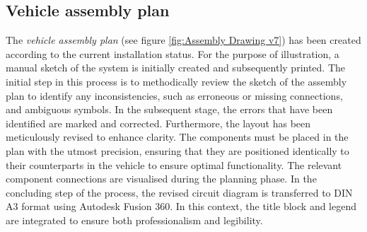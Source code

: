\subsection{Vehicle assembly plan}
The \textit{vehicle assembly plan} (see figure \ref{fig:Assembly Drawing v7}) has been created according to the current installation status. For the purpose of illustration, a manual sketch of the system is initially created and subsequently printed. The initial step in this process is to methodically review the sketch of the assembly plan to identify any inconsistencies, such as erroneous or missing connections, and ambiguous symbols. In the subsequent stage, the errors that have been identified are marked and corrected. Furthermore, the layout has been meticulously revised to enhance clarity. The components must be placed in the plan with the utmost precision, ensuring that they are positioned identically to their counterparts in the vehicle to ensure optimal functionality. The relevant component connections are visualised during the planning phase. In the concluding step of the process, the revised circuit diagram is transferred to DIN A3 format using Autodesk Fusion 360. In this context, the title block and legend are integrated to ensure both professionalism and legibility.



\addtocounter{page}{1}
